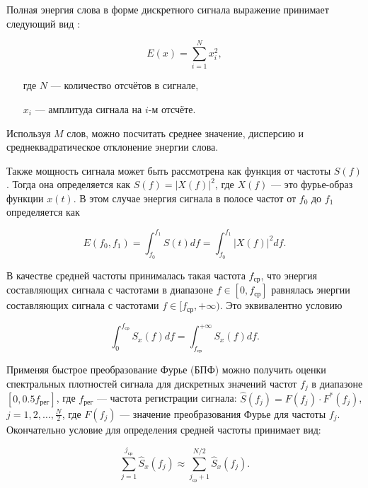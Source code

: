 Полная энергия слова в форме дискретного сигнала выражение принимает следующий вид \cite{max1983methods}:

\begin{equation}
E(x) = \sum_{i=1}^{N} x_i^2,
\end{equation}
\begin{itemize}[align=left,leftmargin=1.8em,itemindent=0pt,labelsep=0pt,labelwidth=1.8em]
	\item[где] $N$ --- количество отсчётов в сигнале,
	\item[] $x_i$ --- амплитуда сигнала на $i$-м отсчёте.
\end{itemize}

Используя $M$ слов, можно посчитать среднее значение, дисперсию и среднеквадратическое отклонение энергии слова.

Также мощность сигнала может быть рассмотрена как функция от частоты $S(f)$.
Тогда она определяется как $S(f) = |X(f)|^2$, где $X(f)$ --- это фурье-образ функции $x(t)$.
В этом случае энергия сигнала в полосе частот от $f_0$ до $f_1$ определяется как

\begin{equation}
E(f_0, f_1) = \int_{f_0}^{f_1} S(t) df = \int_{f_0}^{f_1} |X(f)|^2 df.
\end{equation}

В качестве средней частоты принималась такая частота $f_{\text{ср}}$, что энергия составляющих сигнала с частотами в диапазоне $f \in [0, f_{\text{ср}}]$ равнялась энергии составляющих сигнала с частотами $f \in [f_{\text{ср}}, +\infty)$. Это эквивалентно условию

\begin{equation}
\int_{0}^{f_{\text{ср}}} S_x(f) df = \int_{f_{\text{ср}}}^{+\infty} S_x(f) df.
\end{equation}

Применяя быстрое преобразование Фурье (БПФ) можно получить оценки спектральных плотностей сигнала для дискретных значений частот $f_j$ в диапазоне $[0, 0.5 f_{\text{рег}}]$, где $f_{\text{рег}}$ --- частота регистрации сигнала: $\widehat{S}(f_j) = F(f_j) \cdot F^*(f_j)$, $j = 1, 2, \dots, \frac{N}{2}$, где $F(f_j)$ --- значение преобразования Фурье для частоты $f_j$.
Окончательно условие для определения средней частоты принимает вид:

\begin{equation}
\sum_{j=1}^{j_{\text{ср}}} \widehat{S}_x (f_j) \approx \sum_{j_{\text{ср}}+1}^{N/2} \widehat{S}_x (f_j).
\end{equation}

